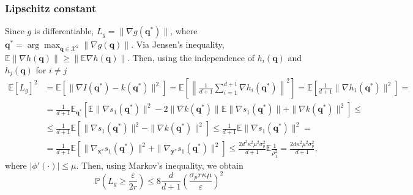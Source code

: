 \subsubsection{Lipschitz constant}
Since $g$ is differentiable, $L_g = \|\nabla g(\mathbf{q}^*) \|$,
where $\mathbf{q}^* = \arg\max_{\mathbf{q} \in \mathcal{X}^2}\|\nabla g(\mathbf{q})\|$.
Via Jensen's inequality, ${\mathbb{E}\|\nabla h(\mathbf{q})\| \geq \|\mathbb{E} \nabla h(\mathbf{q})\|}$.
Then, using the independence of $h_i(\mathbf{q})$ and $h_j(\mathbf{q})$ for $i \neq j$
\begin{align*}
\mathbb{E}[L_g]^2 & = \mathbb{E} \left [ \|\nabla I(\mathbf{q^*}) - k(\mathbf{q}^*) \|^2\right ] =
\mathbb{E} \left [ \left \|\frac{1}{d + 1} \sum_{i = 1}^{d + 1} \nabla h_i(\mathbf{q}^*)\right \|^2 \right] =
\mathbb{E} \left [ \frac{1}{d + 1} \|\nabla h_1(\mathbf{q}^*) \|^2 \right ] = \\
&= \frac{1}{d + 1}\mathbb{E}_{\mathbf{q}^*}\left [ \mathbb{E} \|\nabla s_1(\mathbf{q}^*)\|^2 -
2 \|\nabla k(\mathbf{q}^*)\| \mathbb{E} \|\nabla s_1(\mathbf{q}^*)\| + \|\nabla k(\mathbf{q}^*)\|^2  \right] \leq \\
& \leq \frac{1}{d + 1} \mathbb{E} \left [ \|\nabla s_1(\mathbf{q}^*)\|^2 - \|\nabla k(\mathbf{q}^*)\|^2 \right ] \leq
\frac{1}{d + 1} \mathbb{E}\|\nabla s_1(\mathbf{q}^*)\|^2 = \\
&= \frac{1}{d + 1}\mathbb{E}\left [ \|\nabla_{\mathbf{x}^*} s_1(\mathbf{q}^*)\|^2 + \|\nabla_{\mathbf{y}^*} s_1(\mathbf{q}^*)\|^2 \right ] \leq
\frac{2d^2 \kappa^2 \mu^2 \sigma_p^2}{d + 1} \mathbb{E}\frac{1}{\rho_1^2} = \frac{2d \kappa^2 \mu^2 \sigma_p^2}{d + 1},
\end{align*}
where $|\phi'(\cdot)| \leq \mu$.
Then, using Markov's inequality, we obtain
\[
\mathbb{P}(L_g \geq \frac{\varepsilon}{2r}) \leq 8 \frac{d}{d + 1} \left ( \frac{\sigma_p r \kappa \mu}{\varepsilon} \right)^2
\]

